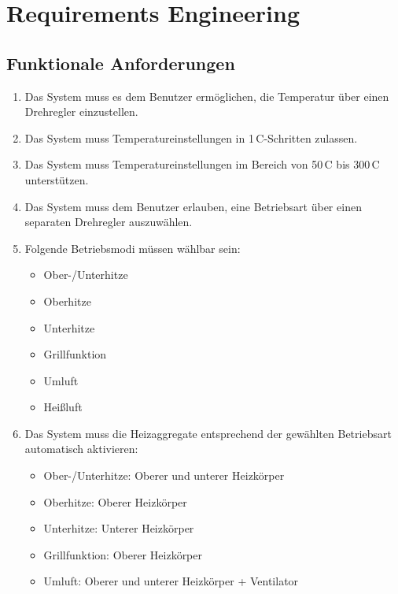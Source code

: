 \documentclass[a4paper,12pt]{article}
\begin{document}
\newpage

\section{Requirements Engineering}

\subsection{Funktionale Anforderungen}

\begin{enumerate}[label=\textbf{R-1.\arabic*}, ref=R-1.\arabic*, itemsep=0pt, topsep=0pt, font=\bfseries]
    \item \label{req:1.1} Das System muss es dem Benutzer ermöglichen, die Temperatur über einen Drehregler einzustellen.
    \item \label{req:1.2} Das System muss Temperatureinstellungen in 1\,\textdegree{}C-Schritten zulassen.
    \item \label{req:1.3} Das System muss Temperatureinstellungen im Bereich von 50\,\textdegree{}C bis 300\,\textdegree{}C unterstützen.
    \item \label{req:1.4} Das System muss dem Benutzer erlauben, eine Betriebsart über einen separaten Drehregler auszuwählen.
    \item \label{req:1.5} Folgende Betriebsmodi müssen wählbar sein:
    \begin{itemize}
        \item Ober-/Unterhitze
        \item Oberhitze
        \item Unterhitze
        \item Grillfunktion
        \item Umluft
        \item Heißluft
    \end{itemize}
    \item \label{req:1.6} Das System muss die Heizaggregate entsprechend der gewählten Betriebsart automatisch aktivieren:
    \begin{itemize}
        \item Ober-/Unterhitze: Oberer und unterer Heizkörper
        \item Oberhitze: Oberer Heizkörper
        \item Unterhitze: Unterer Heizkörper
        \item Grillfunktion: Oberer Heizkörper
        \item Umluft: Oberer und unterer Heizkörper + Ventilator

\end{itemize}
\end{enumerate}
\end{document}
